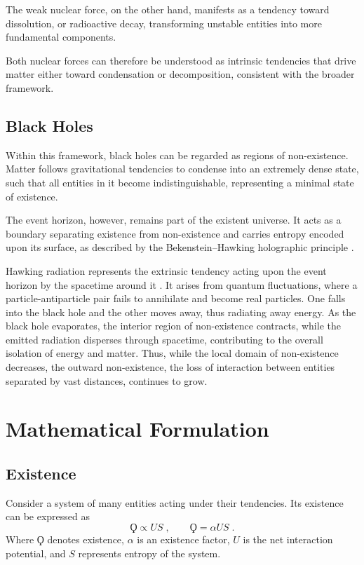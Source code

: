 \documentclass{article}
\begin{document}
The weak nuclear force, on the other hand, manifests as a tendency toward dissolution, or radioactive decay, transforming unstable entities into more fundamental components.  

Both nuclear forces can therefore be understood as intrinsic tendencies that drive matter either toward condensation or decomposition, consistent with the broader framework.


\subsection{Black Holes}

Within this framework, black holes can be regarded as regions of non-existence. 
Matter follows gravitational tendencies to condense into an extremely dense state, such that all entities in it become indistinguishable, representing a minimal state of existence. 

The event horizon, however, remains part of the existent universe. 
It acts as a boundary separating existence from non-existence and carries entropy encoded upon its surface, as described by the Bekenstein–Hawking holographic principle \cite{ferrari2025bekensteinhawkingentropybriefoverview}.

Hawking radiation represents the extrinsic tendency acting upon the event horizon by the spacetime around it \cite{HawkingRadiation2005}.
It arises from quantum fluctuations, where a particle-antiparticle pair fails to annihilate and become real particles. One falls into the black hole and the other moves away, thus radiating away energy.
As the black hole evaporates, the interior region of non-existence contracts, while the emitted radiation disperses through spacetime, contributing to the overall isolation of energy and matter. 
Thus, while the local domain of non-existence decreases, the outward non-existence, the loss of interaction between entities separated by vast distances, continues to grow.



\newpage
\section{Mathematical Formulation}


\subsection{Existence}

Consider a system of many entities acting under their tendencies. 
Its existence can be expressed as
\begin{equation*}
    \Koppa \propto US\;,
    \qquad
    \Koppa = \alpha US\;.
\end{equation*}
Where $\Koppa$ denotes existence, $\alpha$ is an existence factor, $U$ is the net interaction potential, and $S$ represents entropy of the system.
\end{document}
